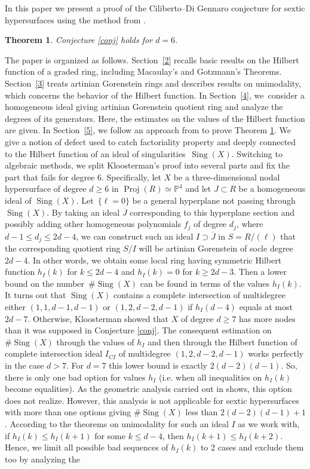\documentclass[a4paper,11pt,english,german]{amsart}
\DeclareMathOperator{\Sing}{Sing}
\DeclareMathOperator{\Proj}{Proj}
\newtheorem{thm}{Theorem}[section]
\theoremstyle{definition}
\begin{document}
In this paper we present a proof of the Ciliberto--Di Gennaro conjecture for sextic hypersurfaces using the method from \cite{kloosterman2022maximal}.

\begin{thm}\label{main}
	Conjecture \ref{conj} holds for $d=6$.
\end{thm}

The paper is organized as follows. Section~\ref{2} recalls basic results on the Hilbert function of a graded ring, including Macaulay's and Gotzmann's Theorems. Section~\ref{3} treats artinian Gorenstein rings and describes results on unimodality, which concerns the behavior of the Hilbert function. In Section~\ref{4}, we~consider a homogeneous ideal giving artinian Gorenstein quotient ring and analyze the degrees of its generators. Here, the estimates on the values of the Hilbert function are given. In Section~\ref{5}, we follow an approach from \cite{kloosterman2022maximal} to prove Theorem \ref{main}. We give a notion of defect used to catch factoriality property and deeply connected to the Hilbert function of an ideal of singularities~$\Sing(X)$. Switching to algebraic methods, we split Kloosterman's proof into several parts and fix the part that fails for degree 6. Specifically, let $X$ be a three-dimensional nodal hypersurface of degree $d \geqslant 6$ in $\Proj (R)\simeq \mathbb{P}^4$ and let $J\subset R$ be a homogeneous ideal of $\Sing(X)$. Let~$\{\ell=0\}$ be a general hyperplane not passing through $\Sing(X)$. By taking an ideal $\overline{J}$ corresponding to this hyperplane section and possibly adding other homogeneous polynomials $f_j$ of degree $d_j$, where~$d-1 \leqslant d_j \leqslant 2d-4$, we can construct such an ideal $I\supset \overline{J}$ in $S=R/(\ell)$ that the corresponding quotient ring $S/I$ will be artinian Gorenstein of socle degree $2d-4$. In other words, we obtain some local ring having symmetric Hilbert function $h_I(k)$ for $k\leqslant 2d-4$ and $h_I(k)=0$ for $k\geqslant 2d -3$. Then a lower bound on the number~$\# \Sing(X)$ can be found in terms of the values $h_I(k)$. It turns out that $\Sing(X)$ contains a complete intersection of multidegree either $(1,1,d-1,d-1)$ or $(1,2,d-2,d-1)$ if $h_I(d-4)$ equals at most $2d-7$. Otherwise, Kloosterman showed that $X$ of degree $d\geqslant 7$ has more nodes than it was supposed in Conjecture \ref{conj}. The consequent estimation on $\# \Sing(X)$ through the values of $h_I$ and then through the Hilbert function of complete intersection ideal $I_{CI}$ of multidegree $(1,2,d-2,d-1)$ works perfectly in the case $d>7$. For $d=7$ this lower bound is exactly $2(d-2)(d-1)$. So, there is only one bad option for values $h_I$ (i.e. when all inequalities on $h_I(k)$ become equalities). As the geometric analysis carried out in \cite{kloosterman2022maximal} shows, this option does not realize. However, this analysis is not applicable for sextic hypersurfaces with more than one options giving $\# \Sing(X)$ less than $2(d-2)(d-1)+1$. According to the theorems on unimodality for such an ideal $I$ as we work with, if $h_I(k)\leqslant h_I(k+1)$ for some $k\leqslant d-4$, then $h_I(k+1)\leqslant h_I(k+2)$. Hence, we limit all possible bad sequences of $h_I(k)$ to 2 cases and exclude them too by analyzing the 
\end{document}

